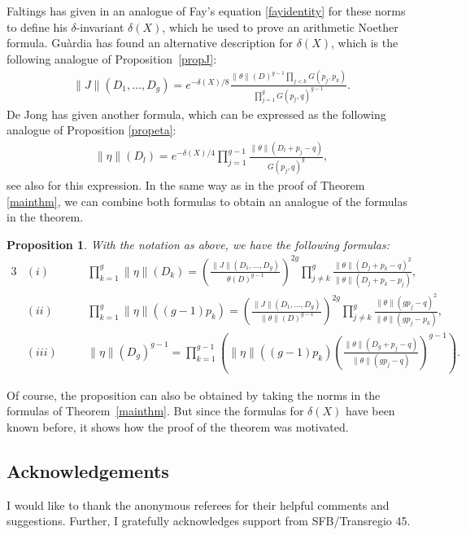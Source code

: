\documentclass[pdftex]{sigma}
\numberwithin{equation}{section}
\newtheorem{Proposition}[Theorem]{Proposition}
 { \theoremstyle{definition}
\newtheorem{Definition}[Theorem]{Definition}
\newtheorem{Note}[Theorem]{Note}
\newtheorem{Example}[Theorem]{Example}
\newtheorem{Remark}[Theorem]{Remark} }
\begin{document}
Faltings has given in \cite[p.~402]{Fal84} an analogue of Fay's equation \eqref{fayidentity} for these norms to define his $\delta$-invariant $\delta(X)$, which he used to prove an arithmetic Noether formula. Gu\`ardia \cite[Corollary 3.6]{Gua99} has found an alternative description for $\delta(X)$, which is the following analogue of Proposition~\ref{propJ}:
\begin{align}\label{equguardia}
	\|J\|(D_{1},\dots,D_{g})=e^{-\delta(X)/8}\frac{\|\theta\|(D)^{g-1}\prod_{j<k}G(p_{j},p_{k})}{\prod_{j=1}^gG(p_{j},q)^{g-1}}.
\end{align}
De Jong \cite[Theorem 4.4]{dJo08} has given another formula, which can be expressed as the following analogue of Proposition \ref{propeta}:
\begin{align*}
	\|\eta\|(D_l)=e^{-\delta(X)/4}\prod_{j=1}^{g-1}\frac{\|\theta\|(D_l+p_j-q)}{G(p_j,q)^g},
\end{align*}
see also \cite[equation (2.7)]{Wil17} for this expression.
In the same way as in the proof of Theorem \ref{mainthm}, we can combine both formulas to obtain an analogue of the formulas in the theorem.
\begin{Proposition}
	With the notation as above, we have the following formulas:
	\begin{alignat*}{3}
&(i)\quad &&
			\prod_{k=1}^g\|\eta\|(D_k)=\left(\frac{\|J\|(D_1,\dots,D_g)^{}}{\theta(D)^{g-1}}\right)^{2g}\prod_{j\neq k}^g\frac{\|\theta\|(D_j+p_k-q)^2}{\|\theta\|(D_j+p_k-p_j)},&\\
& (ii)\quad &&
			\prod_{k=1}^g\|\eta\|((g-1)p_k)=\left(\frac{\|J\|(D_1,\dots,D_g)^{}}{\|\theta\|(D)^{g-1}}\right)^{2g}\prod_{j\neq k}^g\frac{\|\theta\|(gp_j-q)^2}{\|\theta\|(gp_j-p_k)},&\\
& (iii)\quad &&
			\|\eta\|(D_g)^{g-1}=\prod_{k=1}^{g-1}\left(\|\eta\|((g-1)p_k)\left(\frac{\|\theta\|(D_g+p_j-q)}{\|\theta\|(gp_j-q)}\right)^{g-1}\right).&
		\end{alignat*}
\end{Proposition}
Of course, the proposition can also be obtained by taking the norms in the formulas of Theorem~\ref{mainthm}. But since the formulas for $\delta(X)$ have been known before, it shows how the proof of the theorem was motivated.

\subsection*{Acknowledgements}
I would like to thank the anonymous referees for their helpful comments and suggestions.
Further, I gratefully acknowledges support from SFB/Transregio 45.
\end{document}
